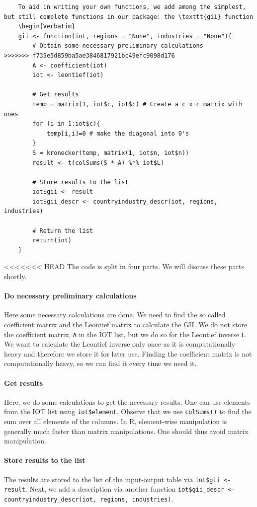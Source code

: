 \documentclass[10pt,a4paper]{paper}
\begin{document}
\begin{itemize}
\begin{Verbatim}
	To aid in writing your own functions, we add among the simplest, but still complete functions in our package: the \texttt{gii} function
	\begin{Verbatim}
	gii <- function(iot, regions = "None", industries = "None"){
		# Obtain some necessary preliminary calculations
>>>>>>> f735e5d859ba5ae3846817921bc49efc9098d176
		A <- coefficient(iot)
		iot <- leontief(iot)
	
		# Get results
		temp = matrix(1, iot$c, iot$c) # Create a c x c matrix with ones
		for (i in 1:iot$c){
			temp[i,i]=0 # make the diagonal into 0's
		}
		S = kronecker(temp, matrix(1, iot$n, iot$n)) 
		result <- t(colSums(S * A) %*% iot$L) 
		
		# Store results to the list
		iot$gii <- result	
		iot$gii_descr <- countryindustry_descr(iot, regions, industries)
		
		# Return the list
		return(iot)
	}	
	\end{Verbatim}
<<<<<<< HEAD
	The code is split in four parts. We will discuss these parts shortly.
	
	\paragraph{Do necessary preliminary calculations} Here some necessary calculations are done. We need to find the so called coefficient matrix and the Leontief matrix to calculate the GII. We do not store the coefficient matrix, \texttt{A} in the IOT list, but we do so for the Leontief inverse \texttt{L}. We want to calculate the Leontief inverse only once as it is computationally heavy and therefore we store it for later use. Finding the coefficient matrix is not computationally heavy, so we can find it every time we need it.
	
	\paragraph{Get results} Here, we do some calculations to get the necessary results. One can use elements from the IOT list using \texttt{iot\$element}. Observe that we use \texttt{colSums()} to find the sum over all elements of the columns. In R, element-wise manipulation is generally much faster than matrix manipulations. One should thus avoid matrix manipulation. 
	
	\paragraph{Store results to the list}
	The results are stored to the list of the input-output table via  \texttt{iot\$gii <- result}. Next, we add a description via another function \texttt{iot\$gii\_descr <- countryindustry\_descr(iot, regions, industries)}. 
	

\end{itemize}
\end{document}
